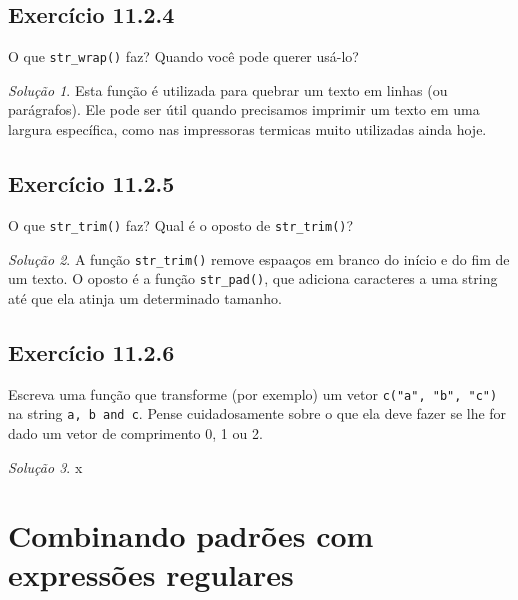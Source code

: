 \documentclass[
]{latex/krantz}
\theoremstyle{definition}
\theoremstyle{definition}
\theoremstyle{definition}
\theoremstyle{definition}
\theoremstyle{remark}
\newtheorem*{solution}{Solução}
\begin{document}
\hypertarget{exr11-2-4}{%
\subsection*{Exercício 11.2.4}\label{exr11-2-4}}

O que \texttt{str\_wrap()} faz? Quando você pode querer usá-lo?

\begin{solution}
Esta função é utilizada para quebrar um texto em linhas (ou parágrafos). Ele pode ser útil quando precisamos imprimir um texto em uma largura específica, como nas impressoras termicas muito utilizadas ainda hoje.
\end{solution}

\hypertarget{exr11-2-5}{%
\subsection*{Exercício 11.2.5}\label{exr11-2-5}}

O que \texttt{str\_trim()} faz? Qual é o oposto de \texttt{str\_trim()}?

\begin{solution}
A função \texttt{str\_trim()} remove espaaços em branco do início e do fim de um texto. O oposto é a função \texttt{str\_pad()}, que adiciona caracteres a uma string até que ela atinja um determinado tamanho.
\end{solution}

\hypertarget{exr11-2-6}{%
\subsection*{Exercício 11.2.6}\label{exr11-2-6}}

Escreva uma função que transforme (por exemplo) um vetor \texttt{c("a",\ "b",\ "c")} na string \texttt{a,\ b\ and\ c}. Pense cuidadosamente sobre o que ela deve fazer se lhe for dado um vetor de comprimento 0, 1 ou 2.

\begin{solution}
x
\end{solution}

\hypertarget{combinando-padruxf5es-com-expressuxf5es-regulares}{%
\section{Combinando padrões com expressões regulares}\label{combinando-padruxf5es-com-expressuxf5es-regulares}}
\end{document}
